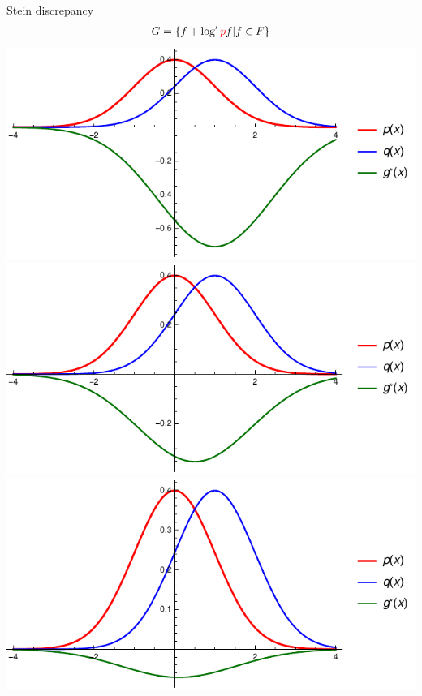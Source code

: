 \begin{frame}
\begin{columns}
\begin{column}{.33\linewidth}
\begin{block}{Stein discrepancy}
 \begin{align*}
G = \{ f  +  \log' {\color{red} p} f | f \in F \}
\end{align*}
\includegraphics[scale=1]{./img/s1.pdf}
\includegraphics[scale=1]{./img/s05.pdf}
\includegraphics[scale=1]{./img/s01.pdf}



\end{block}
\end{column}
\end{columns}
\end{frame}
